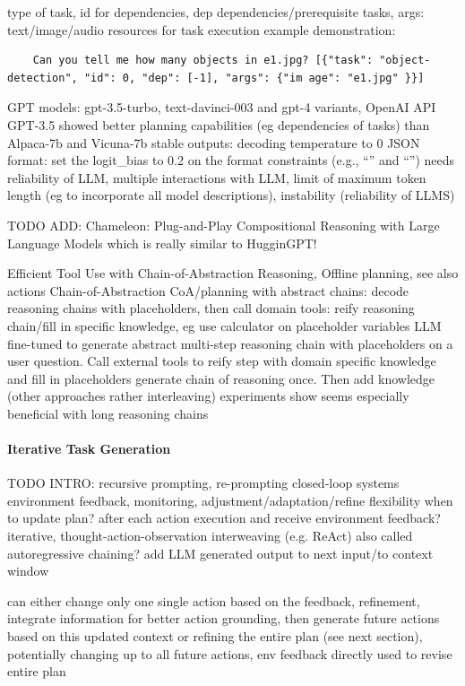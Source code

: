 \documentclass{article}
\begin{document}
type of task, id for dependencies, dep dependencies/prerequisite tasks, args: text/image/audio resources for task execution
example demonstration:
\begin{verbatim}
	Can you tell me how many objects in e1.jpg? [{"task": "object-detection", "id": 0, "dep": [-1], "args": {"im age": "e1.jpg" }}]
\end{verbatim}
GPT models: gpt-3.5-turbo, text-davinci-003 and gpt-4 variants, OpenAI API
GPT-3.5 showed better planning capabilities (eg dependencies of tasks) than Alpaca-7b and Vicuna-7b
stable outputs: decoding temperature to 0
JSON format: set the logit\_bias to 0.2 on the format constraints (e.g., “{” and “}”)
needs reliability of LLM, multiple interactions with LLM, limit of maximum token length (eg to incorporate all model descriptions), instability (reliability of LLMS)

TODO ADD: Chameleon: Plug-and-Play Compositional Reasoning with Large Language Models
which is really similar to HugginGPT! \cite{lu_chameleon_2023}


\cite{gao_efficient_2024} Efficient Tool Use with Chain-of-Abstraction Reasoning, Offline planning, see also actions
Chain-of-Abstraction CoA/planning with abstract chains: decode reasoning chains with placeholders, then call domain tools: reify reasoning chain/fill in specific knowledge, eg use calculator on placeholder variables
LLM fine-tuned to generate abstract multi-step reasoning chain with placeholders on a user question. Call external tools to reify step with domain specific knowledge and fill in placeholders
generate chain of reasoning once. Then add knowledge (other approaches rather interleaving)
experiments show seems especially beneficial with long reasoning chains

\paragraph{Iterative Task Generation}

TODO INTRO: 
recursive prompting, re-prompting 
closed-loop systems 
environment feedback, monitoring, adjustment/adaptation/refine 
flexibility 
when to update plan? after each action execution and receive environment feedback? 
iterative, thought-action-observation interweaving (e.g. ReAct) 
also called autoregressive chaining? 
add LLM generated output to next input/to context window

can either change only one single action based on the feedback, refinement, integrate information for better action grounding, then generate future actions based on this updated context
or refining the entire plan (see next section), potentially changing up to all future actions, env feedback directly used to revise entire plan
\end{document}
